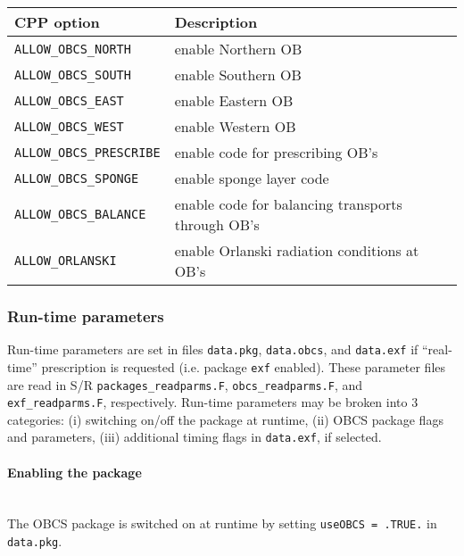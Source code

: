 \begin{table}[h!]
\centering
  \label{tab:pkg:obcs:cpp}
  {\footnotesize
    \begin{tabular}{|l|l|}
      \hline 
      \textbf{CPP option}  &  \textbf{Description}  \\
      \hline \hline
        \texttt{ALLOW\_OBCS\_NORTH} & 
          enable Northern OB \\
        \texttt{ALLOW\_OBCS\_SOUTH} & 
          enable Southern OB \\
        \texttt{ALLOW\_OBCS\_EAST} & 
          enable Eastern OB \\
        \texttt{ALLOW\_OBCS\_WEST} & 
          enable Western OB \\
      \hline
        \texttt{ALLOW\_OBCS\_PRESCRIBE} & 
          enable code for prescribing OB's \\
        \texttt{ALLOW\_OBCS\_SPONGE} & 
          enable sponge layer code \\
        \texttt{ALLOW\_OBCS\_BALANCE} & 
          enable code for balancing transports through OB's \\
        \texttt{ALLOW\_ORLANSKI} & 
          enable Orlanski radiation conditions at OB's \\
      \hline
    \end{tabular}
  }
  \caption{~}
\end{table}



\subsubsection{Run-time parameters
\label{sec:pkg:obcs:runtime}}

Run-time parameters are set in files 
\texttt{data.pkg}, \texttt{data.obcs}, and \texttt{data.exf} 
if ``real-time'' prescription is requested 
(i.e. package \texttt{exf} enabled).
These parameter files are read in S/R
\texttt{packages\_readparms.F}, \texttt{obcs\_readparms.F}, and
\texttt{exf\_readparms.F}, respectively.
Run-time parameters may be broken into 3 categories:
(i) switching on/off the package at runtime,
(ii) OBCS package flags and parameters,
(iii) additional timing flags in \texttt{data.exf}, if selected.

\paragraph{Enabling the package}
~ \\
%
The OBCS package is switched on at runtime by setting
\texttt{useOBCS = .TRUE.} in \texttt{data.pkg}.

